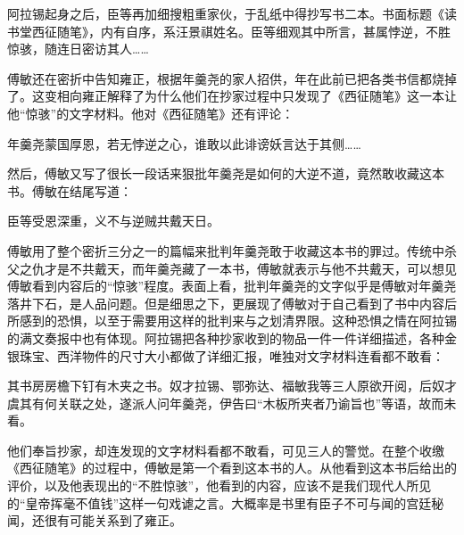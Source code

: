 
\begin{bookquote}阿拉锡起身之后，臣等再加细搜粗重家伙，于乱纸中得抄写书二本。书面标题《读书堂西征随笔》，内有自序，系汪景祺姓名。臣等细观其中所言，甚属悖逆，不胜惊骇，随连日密访其人……\end{bookquote}


傅敏还在密折中告知雍正，根据年羹尧的家人招供，年在此前已把各类书信都烧掉了。这变相向雍正解释了为什么他们在抄家过程中只发现了《西征随笔》这一本让他“惊骇”的文字材料。他对《西征随笔》还有评论：



\begin{bookquote}年羹尧蒙国厚恩，若无悖逆之心，谁敢以此诽谤妖言达于其侧……\end{bookquote}


然后，傅敏又写了很长一段话来狠批年羹尧是如何的大逆不道，竟然敢收藏这本书。傅敏在结尾写道：



\begin{bookquote}臣等受恩深重，义不与逆贼共戴天日。\end{bookquote}


傅敏用了整个密折三分之一的篇幅来批判年羹尧敢于收藏这本书的罪过。传统中杀父之仇才是不共戴天，而年羹尧藏了一本书，傅敏就表示与他不共戴天，可以想见傅敏看到内容后的“惊骇”程度。表面上看，批判年羹尧的文字似乎是傅敏对年羹尧落井下石，是人品问题。但是细思之下，更展现了傅敏对于自己看到了书中内容后所感到的恐惧，以至于需要用这样的批判来与之划清界限。这种恐惧之情在阿拉锡的满文奏报中也有体现。阿拉锡把各种抄家收到的物品一件一件详细描述，各种金银珠宝、西洋物件的尺寸大小都做了详细汇报，唯独对文字材料连看都不敢看：



\begin{bookquote}其书房房檐下钉有木夹之书。奴才拉锡、鄂弥达、福敏我等三人原欲开阅，后奴才虞其有何关联之处，遂派人问年羹尧，伊告曰“木板所夹者乃谕旨也”等语，故而未看。\end{bookquote}


他们奉旨抄家，却连发现的文字材料看都不敢看，可见三人的警觉。在整个收缴《西征随笔》的过程中，傅敏是第一个看到这本书的人。从他看到这本书后给出的评价，以及他表现出的“不胜惊骇”，他看到的内容，应该不是我们现代人所见的“皇帝挥毫不值钱”这样一句戏谑之言。大概率是书里有臣子不可与闻的宫廷秘闻，还很有可能关系到了雍正。


